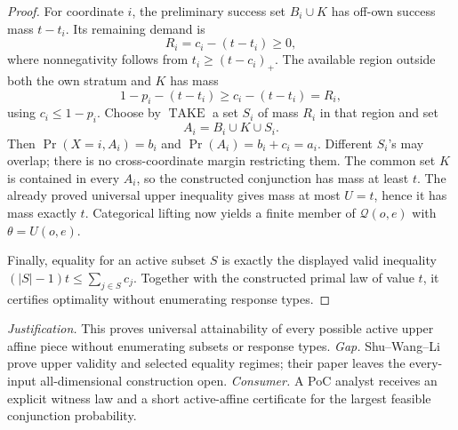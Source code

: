 \documentclass{article}
\begin{document}
\begin{proof}
For coordinate \(i\), the preliminary success set \(B_i\cup K\) has off-own success mass \(t-t_i\).  Its remaining demand is
\[
 R_i=c_i-(t-t_i)\geq0,
\]
where nonnegativity follows from \(t_i\geq(t-c_i)_+\).  The available region outside both the own stratum and \(K\) has mass
\[
 1-p_i-(t-t_i)\geq c_i-(t-t_i)=R_i,
\]
using \(c_i\leq1-p_i\).  Choose by \(\operatorname{TAKE}\) a set \(S_i\) of mass \(R_i\) in that region and set
\[
 A_i=B_i\cup K\cup S_i.
\]
Then \(\Pr(X=i,A_i)=b_i\) and \(\Pr(A_i)=b_i+c_i=a_i\).  Different \(S_i\)'s may overlap; there is no cross-coordinate margin restricting them.  The common set \(K\) is contained in every \(A_i\), so the constructed conjunction has mass at least \(t\).  The already proved universal upper inequality gives mass at most \(U=t\), hence it has mass exactly \(t\).  Categorical lifting now yields a finite member of \(\mathcal Q(o,e)\) with \(\theta=U(o,e)\).

Finally, equality for an active subset \(S\) is exactly the displayed valid inequality \((|S|-1)t\leq\sum_{j\in S}c_j\).  Together with the constructed primal law of value \(t\), it certifies optimality without enumerating response types.
\end{proof}
\par\smallskip\noindent \textit{Justification.} This proves universal attainability of every possible active upper affine piece without enumerating subsets or response types. \textit{Gap.} Shu--Wang--Li prove upper validity and selected equality regimes; their paper leaves the every-input all-dimensional construction open. \textit{Consumer.} A PoC analyst receives an explicit witness law and a short active-affine certificate for the largest feasible conjunction probability.
\end{document}
